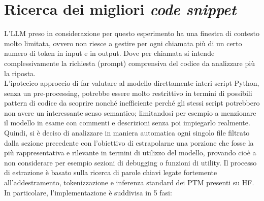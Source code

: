 \documentclass{article}
\begin{document}
\section{Ricerca dei migliori \textit{code snippet}}
L'LLM preso in considerazione per questo esperimento ha una finestra di contesto molto limitata, ovvero non riesce a gestire per ogni chiamata più di un certo numero di token in input e in output. Dove per chiamata si intende complessivamente la richiesta (prompt) comprensiva del codice da analizzare più la riposta.\\
L'ipotecico approccio di far valutare al modello direttamente interi script Python, senza un pre-processing, potrebbe essere molto restrittivo in termini di possibili pattern di codice da scoprire nonché inefficiente perché gli stessi script potrebbero non avere un interessante senso semantico; limitandosi per esempio a menzionare il modello in esame con commenti e descrizioni senza poi impiegarlo realmente.\\
Quindi, si è deciso di analizzare in maniera automatica ogni singolo file filtrato dalla sezione precedente con l'obiettivo di estrapolarne una porzione che fosse la più rappresentativa e rilevante in termini di utilizzo del modello, provando cioè a non considerare per esempio sezioni di debugging o funzioni di utility. Il processo di estrazione è basato sulla ricerca di parole chiavi legate fortemente all'addestramento, tokenizzazione e inferenza standard dei PTM presenti su HF. In particolare, l'implementazione è suddivisa in 5 fasi:\\
\end{document}
